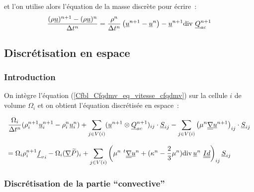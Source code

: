 et l'on utilise alors l'équation de la masse discrète pour écrire~:
\begin{equation}
\displaystyle
\frac{(\rho \underline{u})^{n+1} - (\rho \underline{u})^n}{\Delta t^n}
=
\frac{\rho^{n}}{\Delta t^n}\left(\underline{u}^{n+1} - \underline{u}^n\right)-
\underline{u}^{n+1}\text{div}\,\,\underline{Q}_{ac}^{n+1}
\end{equation}



\subsection*{Discrétisation en espace}

\subsubsection*{Introduction}

On intègre l'équation (\ref{Cfbl_Cfqdmv_eq_vitesse_cfqdmv})
sur la cellule $i$ de volume $\Omega_i$ et
on obtient l'équation discrétisée en espace~:

\begin{equation}\label{Cfbl_Cfqdmv_eq_vitesse_discrete_cfqdmv}
\begin{array}{l}
\displaystyle\frac{\Omega_i}{\Delta t^n}
(\rho_i^{n+1}\underline{u}_i^{n+1}-\rho_i^n\underline{u}_i^n)
+ \displaystyle\sum\limits_{j\in V(i)}
(\underline{u}^{n+1} \otimes \underline{Q}_{ac}^{n+1})_{ij} \cdot \underline{S}_{ij}
- \displaystyle\sum\limits_{j\in V(i)}
\left(\mu^n\underline{\underline{{\nabla}}}{\underline{u}^{n+1}}\right)_{ij} \cdot \underline{S}_{ij}\\
\\
= \Omega_i\rho_i^{n+1} {\underline{f}_v}_i
- \Omega_i(\underline{\nabla}{\widetilde{P}})_i
+ \displaystyle\sum\limits_{j\in V(i)}
\left(\mu^n\ ^t\underline{\underline{{\nabla}}}{\underline{u}^n} + (\kappa^n-\frac{2}{3}\mu^n)
\text{div}\,{\underline{u}^n}\ \underline{\underline{Id}}\right)_{ij}\underline{S}_{ij}\\
\end{array}
\end{equation}

\subsubsection*{Discrétisation de la partie ``convective''}

